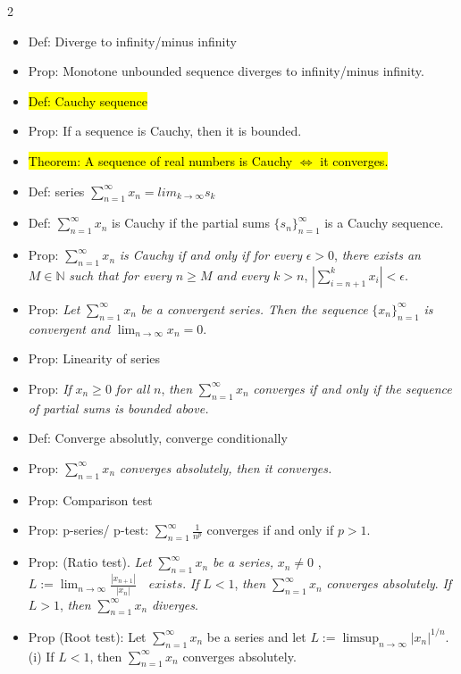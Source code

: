 \documentclass[a4paper,10pt]{article}
\begin{document}
\begin{multicols}{2}
\begin{itemize}
    $\{x_{n_i}\}_{i=1}^{\infty}$
    \item Def: Diverge to infinity/minus infinity
    \item Prop: Monotone unbounded sequence diverges to infinity/minus infinity.
    \item \hl{Def: Cauchy sequence}
    \item Prop: If a sequence is Cauchy, then it is bounded.
    \item \hl{Theorem: A sequence of real numbers is Cauchy $\Leftrightarrow$ it converges.}
    \item Def: series $\sum_{n=1}^{\infty}x_n=lim_{k\to \infty}s_k$
    \item Def: $\sum_{n=1}^{\infty}x_n$ is Cauchy if the partial sums $\{s_n\}_{n=1}^\infty$ is a Cauchy sequence.
    \item Prop: $\sum_{n=1}^{\infty} x_n$ \textit{is Cauchy if and only if for every} $\epsilon > 0$, \textit{there exists an} $M \in \mathbb{N}$ \textit{such that for every} $n \geq M$ \textit{and every} $k > n$, $\left| \sum_{i=n+1}^{k} x_i \right| < \epsilon.$
    \item Prop: \textit{Let} $\sum_{n=1}^{\infty} x_n$ \textit{be a convergent series. Then the sequence} $\{x_n\}_{n=1}^{\infty}$ \textit{is convergent and} $\lim_{n \to \infty} x_n = 0.$
    \item Prop: Linearity of series
    \item Prop: \textit{If} $x_n \geq 0$ \textit{for all} $n$, \textit{then} $\sum_{n=1}^{\infty} x_n$ \textit{converges if and only if the sequence of partial sums is bounded above.}
    \item Def: Converge absolutly, converge conditionally
    \item Prop: $\sum_{n=1}^{\infty} x_n$ \textit{converges absolutely, then it converges.}
    \item Prop: Comparison test
    \item Prop: p-series/ p-test: $\sum_{n=1}^{\infty} \frac{1}{n^p}$ converges if and only if $p>1$.
    \item Prop: (Ratio test). \textit{Let} $\sum_{n=1}^{\infty} x_n$ \textit{be a series,} $x_n \neq 0$ , $L := \lim_{n \to \infty} \frac{|x_{n+1}|}{|x_n|} \quad \textit{exists}.$  \textit{If} $L < 1$, \textit{then} $\sum_{n=1}^{\infty} x_n$ \textit{converges absolutely}. \textit{If} $L > 1$, \textit{then} $\sum_{n=1}^{\infty} x_n$ \textit{diverges}.
    \item Prop (Root test): Let $\sum_{n=1}^{\infty} x_n$ be a series and let $L := \limsup_{n \to \infty} |x_n|^{1/n}.$ (i) If $L < 1$, then $\sum_{n=1}^{\infty} x_n$ converges absolutely.  

\end{itemize}
\end{multicols}
\end{document}
